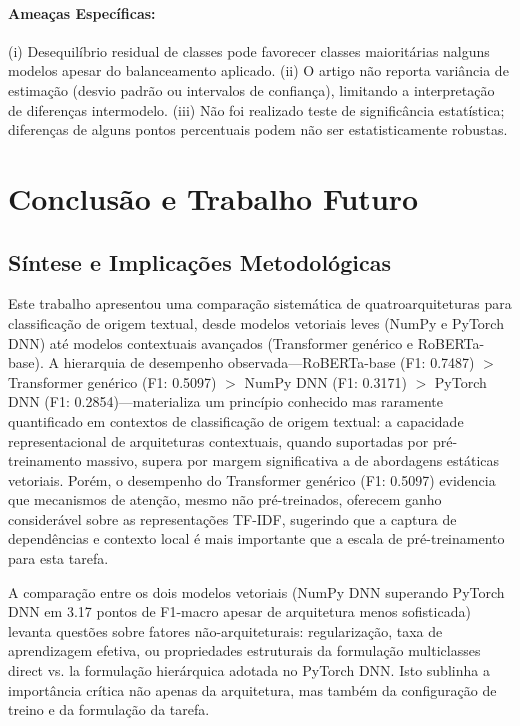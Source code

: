\documentclass[runningheads]{llncs}
\begin{document}
\paragraph{Ameaças Específicas:} (i) Desequilíbrio residual de classes pode favorecer classes maioritárias nalguns modelos apesar do balanceamento aplicado. (ii) O artigo não reporta variância de estimação (desvio padrão ou intervalos de confiança), limitando a interpretação de diferenças intermodelo. (iii) Não foi realizado teste de significância estatística; diferenças de alguns pontos percentuais podem não ser estatisticamente robustas.

\section{Conclusão e Trabalho Futuro}

\subsection{Síntese e Implicações Metodológicas}

Este trabalho apresentou uma comparação sistemática de quatroarquiteturas para classificação de origem textual, desde modelos vetoriais leves (NumPy e PyTorch DNN) até modelos contextuais avançados (Transformer genérico e RoBERTa-base). A hierarquia de desempenho observada—RoBERTa-base (F1: 0.7487) $>$ Transformer genérico (F1: 0.5097) $>$ NumPy DNN (F1: 0.3171) $>$ PyTorch DNN (F1: 0.2854)—materializa um princípio conhecido mas raramente quantificado em contextos de classificação de origem textual: a capacidade representacional de arquiteturas contextuais, quando suportadas por pré-treinamento massivo, supera por margem significativa a de abordagens estáticas vetoriais. Porém, o desempenho do Transformer genérico (F1: 0.5097) evidencia que mecanismos de atenção, mesmo não pré-treinados, oferecem ganho considerável sobre as representações TF-IDF, sugerindo que a captura de dependências e contexto local é mais importante que a escala de pré-treinamento para esta tarefa.

A comparação entre os dois modelos vetoriais (NumPy DNN superando PyTorch DNN em 3.17 pontos de F1-macro apesar de arquitetura menos sofisticada) levanta questões sobre fatores não-arquiteturais: regularização, taxa de aprendizagem efetiva, ou propriedades estruturais da formulação multiclasses direct vs. la formulação hierárquica adotada no PyTorch DNN. Isto sublinha a importância crítica não apenas da arquitetura, mas também da configuração de treino e da formulação da tarefa.
\end{document}
